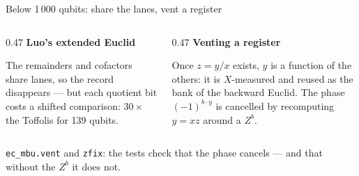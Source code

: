 \documentclass[aspectratio=169,11pt]{beamer}
\newcommand{\blocktitle}[1]{{\bfseries #1}\par\vskip1mm}
\begin{document}
\begin{frame}{Below 1\,000 qubits: share the lanes, vent a register}
  \begin{columns}[T]
    \begin{column}{0.47\textwidth}
      \blocktitle{Luo's extended Euclid}
      The remainders and cofactors share lanes, so the record disappears --- but each quotient bit costs a shifted comparison: $30\times$ the Toffolis for 139 qubits.
    \end{column}
    \begin{column}{0.47\textwidth}
      \blocktitle{Venting a register}
      Once $z=y/x$ exists, $y$ is a function of the others: it is $X$-measured and reused as the bank of the backward Euclid. The phase $(-1)^{b\cdot y}$ is cancelled by recomputing $y=xz$ around a $Z^b$.
    \end{column}
  \end{columns}
  \begin{takeaway}\texttt{ec\_mbu.vent} and \texttt{zfix}: the tests check that the phase cancels --- and that without the $Z^b$ it does not.\end{takeaway}
\end{frame}
\end{document}
